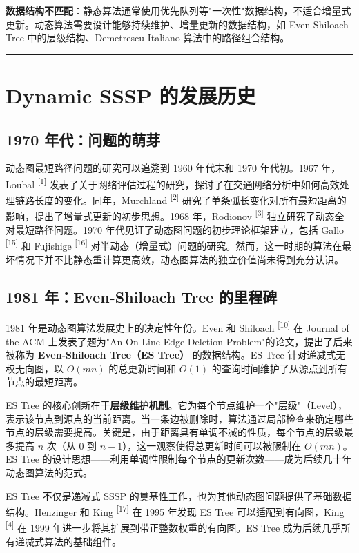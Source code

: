 \documentclass[12pt,a4paper]{ctexart}
\let\oldsection\section
\renewcommand{\section}{\clearpage\oldsection}
\begin{document}
\textbf{数据结构不匹配}：静态算法通常使用优先队列等"一次性"数据结构，不适合增量式更新。动态算法需要设计能够持续维护、增量更新的数据结构，如 Even-Shiloach Tree 中的层级结构、Demetrescu-Italiano 算法中的路径组合结构。

\noindent\rule{\textwidth}{0.4pt}
\section{Dynamic SSSP 的发展历史}

\subsection{1970 年代：问题的萌芽}

动态图最短路径问题的研究可以追溯到 1960 年代末和 1970 年代初。1967 年，Loubal \textsuperscript{[1]}  发表了关于网络评估过程的研究，探讨了在交通网络分析中如何高效处理链路长度的变化。同年，Murchland \textsuperscript{[2]}  研究了单条弧长变化对所有最短距离的影响，提出了增量式更新的初步思想。1968 年，Rodionov \textsuperscript{[3]}  独立研究了动态全对最短路径问题。1970 年代见证了动态图问题的初步理论框架建立，包括 Gallo \textsuperscript{[15]}  和 Fujishige \textsuperscript{[16]}  对半动态（增量式）问题的研究。然而，这一时期的算法在最坏情况下并不比静态重计算更高效，动态图算法的独立价值尚未得到充分认识。

\subsection{1981 年：Even-Shiloach Tree 的里程碑}

1981 年是动态图算法发展史上的决定性年份。Even 和 Shiloach \textsuperscript{[10]}  在 Journal of the ACM 上发表了题为"An On-Line Edge-Deletion Problem"的论文，提出了后来被称为 \textbf{Even-Shiloach Tree（ES Tree）} 的数据结构。ES Tree 针对递减式无权无向图，以 $O(mn)$ 的总更新时间和 $O(1)$ 的查询时间维护了从源点到所有节点的最短距离。

ES Tree 的核心创新在于\textbf{层级维护机制}。它为每个节点维护一个"层级"（Level），表示该节点到源点的当前距离。当一条边被删除时，算法通过局部检查来确定哪些节点的层级需要提高。关键是，由于距离具有单调不减的性质，每个节点的层级最多提高 $n$ 次（从 0 到 $n-1$），这一观察使得总更新时间可以被限制在 $O(mn)$。ES Tree 的设计思想——利用单调性限制每个节点的更新次数——成为后续几十年动态图算法的范式。

ES Tree 不仅是递减式 SSSP 的奠基性工作，也为其他动态图问题提供了基础数据结构。Henzinger 和 King \textsuperscript{[17]}  在 1995 年发现 ES Tree 可以适配到有向图，King \textsuperscript{[4]}  在 1999 年进一步将其扩展到带正整数权重的有向图。ES Tree 成为后续几乎所有递减式算法的基础组件。
\end{document}
